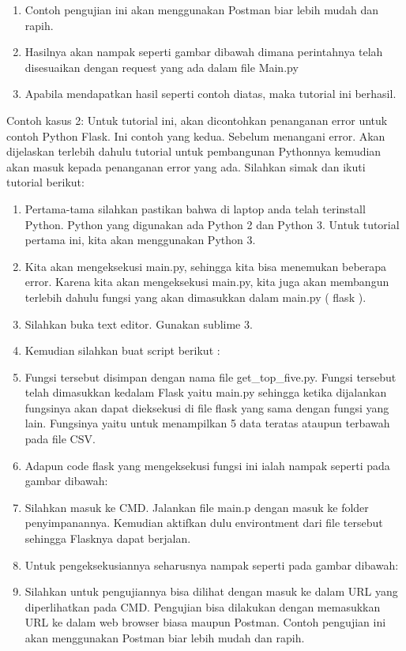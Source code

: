 \begin{enumerate}
\item Contoh pengujian ini akan menggunakan Postman biar lebih mudah dan rapih.
\item Hasilnya akan nampak seperti gambar dibawah dimana perintahnya telah disesuaikan dengan request yang ada dalam file Main.py
\item Apabila mendapatkan hasil seperti contoh diatas, maka tutorial ini berhasil. 
\end{enumerate}

Contoh kasus 2: Untuk tutorial ini, akan dicontohkan penanganan error untuk contoh Python Flask. Ini contoh yang kedua. Sebelum menangani error. Akan dijelaskan terlebih dahulu tutorial untuk pembangunan Pythonnya kemudian akan masuk kepada penanganan error yang ada. Silahkan simak dan ikuti tutorial berikut:
\begin{enumerate}
\item Pertama-tama silahkan pastikan bahwa di laptop anda telah terinstall Python. Python yang digunakan ada Python 2 dan Python 3. Untuk tutorial pertama ini, kita akan menggunakan Python 3.
\item Kita akan mengeksekusi main.py, sehingga kita bisa menemukan beberapa error. Karena kita akan mengeksekusi main.py, kita juga akan membangun terlebih dahulu fungsi yang akan dimasukkan dalam main.py ( flask ).
\item Silahkan buka text editor. Gunakan sublime 3.
\item Kemudian silahkan buat script berikut :
\item Fungsi tersebut disimpan dengan nama file get\_top\_five.py. Fungsi tersebut telah dimasukkan kedalam Flask yaitu main.py sehingga ketika dijalankan fungsinya akan dapat dieksekusi di file flask yang sama dengan fungsi yang lain. Fungsinya yaitu untuk menampilkan 5 data teratas ataupun terbawah pada file CSV.
\item Adapun code flask yang mengeksekusi fungsi ini ialah nampak seperti pada gambar dibawah:
\item Silahkan masuk ke CMD. Jalankan file main.p dengan masuk ke folder penyimpanannya. Kemudian aktifkan dulu environtment dari file tersebut sehingga Flasknya dapat berjalan.
\item Untuk pengeksekusiannya seharusnya nampak seperti pada gambar dibawah:
\item Silahkan untuk pengujiannya bisa dilihat dengan masuk ke dalam URL yang diperlihatkan pada CMD. Pengujian bisa dilakukan dengan memasukkan URL ke dalam web browser biasa maupun Postman. Contoh pengujian ini akan menggunakan Postman biar lebih mudah dan rapih.

\end{enumerate}
